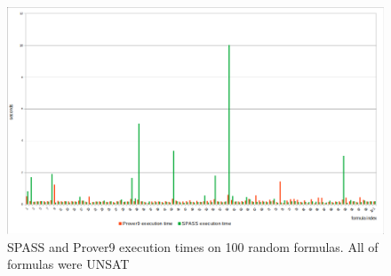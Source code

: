 
\begin{figure}[ht]
\begin{centering}
  \includegraphics[width=\textwidth]{logic-formula-generator/dataset_analysis/execution_times.png}
  \caption{SPASS and Prover9 execution times on 100 random formulas. All of formulas were UNSAT}
  \label{pic:benchmark_results}
\end{centering}
\end{figure}

